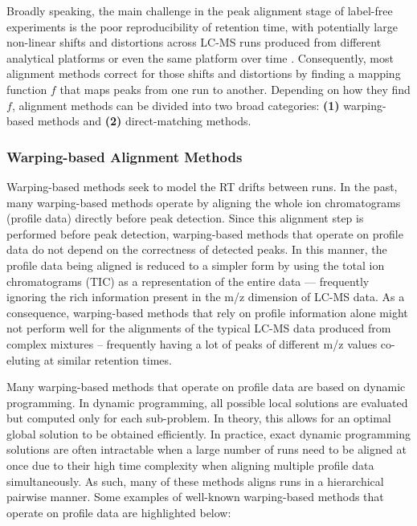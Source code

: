 Broadly speaking, the main challenge in the peak alignment stage of label-free experiments is the poor reproducibility of retention time, with potentially large non-linear shifts and distortions across LC-MS runs produced from different analytical platforms or even the same platform over time \cite{podwojski2009retention}. Consequently, most alignment methods correct for those shifts and distortions by finding a mapping function $f$ that maps peaks from one run to another. Depending on how they find $f$, alignment methods can be divided into two broad categories: \textbf{(1)} warping-based methods and \textbf{(2)} direct-matching methods.

\subsubsection{Warping-based Alignment Methods}

Warping-based methods seek to model the RT drifts between runs. In the past, many warping-based methods operate by aligning the whole ion chromatograms (profile data) directly before peak detection. Since this alignment step is performed before peak detection, warping-based methods that operate on profile data do not depend on the correctness of detected peaks. In this manner, the profile data being aligned is reduced to a simpler form by using the total ion chromatograms (TIC) as a representation of the entire data --- frequently ignoring the rich information present in the m/z dimension of LC-MS data. As a consequence, warping-based methods that rely on profile information alone might not perform well for the alignments of the typical LC-MS data produced from complex mixtures -- frequently having a lot of peaks of different m/z values co-eluting at similar retention times. 

Many warping-based methods that operate on profile data are based on dynamic programming. In dynamic programming, all possible local solutions are evaluated but computed only for each sub-problem. In theory, this allows for an optimal global solution to be obtained efficiently. In practice, exact dynamic programming solutions are often intractable when a large number of runs need to be aligned at once due to their high time complexity when aligning multiple profile data simultaneously. As such, many of these methods aligns runs in a hierarchical pairwise manner. Some examples of well-known warping-based methods that operate on profile data are highlighted below: 

